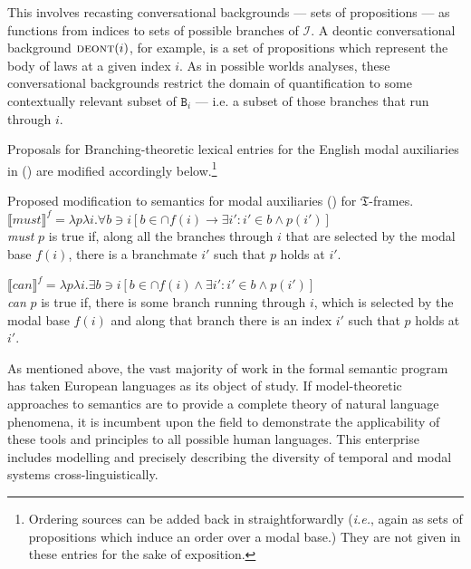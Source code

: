 \documentclass[12pt,dvipsnames]{report}
\providecommand{\denote}[2][]{\ensuremath{\llbracket{#2}\rrbracket^{#1}}}
\begin{document}
This involves recasting conversational backgrounds --- sets of propositions --- as functions from indices to sets of possible branches of $ \mathcal I $. A deontic conversational background $ \textsc{deont}(i) $, for example, is a set of propositions which represent the body of laws at a given index $ i $. As in possible worlds analyses, these conversational backgrounds restrict the domain of quantification to some contextually relevant subset of  $ \texttt{B}_i $ --- i.e. a subset of those branches that run through $ i $.

Proposals for Branching-theoretic lexical entries for the English modal auxiliaries in () are modified accordingly below.\footnote{Ordering sources can be added back in straightforwardly (\textit{i.e.}, again as sets of propositions which induce an order over a modal base.) They are not given in these entries for the sake of exposition.}

\pex[exno=\getref{K-modals}′⁣] Proposed modification to semantics for modal auxiliaries () for $ \mathfrak T $-frames.
\a$ \denote[f]{\textit{must}}=\lambda p\lambda i.\forall b\ni i[b\in\cap f(i)\to \exists i':i'\in b\wedge p(i')] $\\
\textit{must} $ p $ is true if, along all the branches through $ i $ that are selected by the modal base $ f(i) $, there is a branchmate $ i' $ such that $ p $ holds at $ i' $.

\a$ \denote[f]{\textit{can}}=\lambda p\lambda i.\exists b\ni i[b\in\cap f(i)\wedge \exists i':i'\in b\wedge p(i')] $\\
\textit{ can } $ p $ is true if, there is some branch running through $ i $, which is selected by the modal base $ f(i) $ and along that branch there is an index $ i' $ such that $ p $ holds at $ i' $.


\xe



As mentioned above, the vast majority of work in the formal semantic program has taken European languages as its object of study. If model-theoretic approaches to semantics are to provide a complete theory of natural language phenomena, it is incumbent upon the field to demonstrate the applicability of these tools and principles to all possible human languages. This enterprise includes modelling and precisely describing the diversity of temporal and modal systems cross-linguistically.
\end{document}
